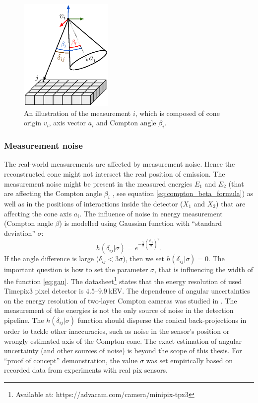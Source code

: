 \begin{figure}[!h]
  \centering
    \includegraphics[width=0.4\textwidth]{./fig/photos/system_comp.eps}
    \caption{An illustration of the measurement $i$, which is composed of cone origin $v_{i}$, axis vector $a_{i}$ and Compton angle $\beta_{i}$.}
    \label{fig:system_comp}
\end{figure}
\subsubsection{Measurement noise}
The real-world measurements are affected by measurement noise. Hence the reconstructed cone might not intersect the real position of emission.
The measurement noise might be present in the measured energies $E_{1}$ and $E_{2}$ (that are affecting the Compton angle $\beta_{i}$ , see equation \ref{eq:compton_beta_formula}) 
as well as in the positions of interactions inside the detector ($X_{1}$ and $X_{2}$) 
that are affecting the cone axis $a_{i}$.
The influence of noise in energy measurement (Compton angle $\beta$) is modelled using Gaussian function with ``standard deviation'' $\sigma$:
\begin{equation}
  h(\delta_{ij}|\sigma) = e^{-\frac{1}{2}(\frac{\delta_{ij}}{\sigma})^{2}}.
  \label{eq:gau}
\end{equation}
If the angle difference is large ($\delta_{ij}<3\sigma$), then we set $h(\delta_{ij}|\sigma) = 0$.
The important question is how to set the parameter $\sigma$, that is influencing the width of the function \ref{eq:gau}.
The datasheet\footnote{Available at: https://advacam.com/camera/minipix-tpx3}
states that the energy resolution of used Timepix3 pixel detector is $4.5$--$9.9\ \mathrm{kEV}$. 
The dependence of angular uncertainties on the energy resolution of two-layer Compton cameras was studied in \cite{ordonez}.
The measurement of the energies is not the only source of noise in the detection pipeline.
The $h(\delta_{ij}|\sigma)$ function should disperse the conical back-projections in order to tackle other inaccuracies, such as noise in the sensor's position or wrongly estimated axis of the Compton cone. 
The exact estimation of angular uncertainty (and other sources of noise) is beyond the scope of this thesis.
For ``proof of concept'' demonstration, the value $\sigma$ was set empirically based on recorded data from experiments with real \ac{pix} sensors.

